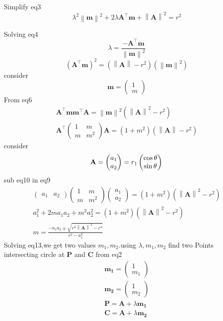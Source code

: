 \documentclass[journal,10pt,twocolumn]{article}
\providecommand{\norm}[1]{\left\lVert#1\right\rVert}
\let\vec\mathbf
\newcommand{\myvec}[1]{\ensuremath{\begin{pmatrix}#1\end{pmatrix}}}
\begin{document}
Simplify eq3
\begin{equation}
	\lambda^{2}\norm{\boldsymbol{m}}^{2}+2\lambda\vec{A}^\top\vec{m}+\norm{\boldsymbol{A}}^{2}=r^{2}
\end{equation}

Solving eq4
\begin{equation}
	\lambda=\frac{-\vec{A}^\top\vec{m}}{\norm{\boldsymbol{m}}^{2}}  
\end{equation}
\begin{equation}
	(\vec{A}^\top\vec{m})^{2}=(\norm{\boldsymbol{A}}-r^{2})(\norm{\boldsymbol{m}}^{2})
\end{equation}
consider
\begin{equation}
	\vec{m}=\myvec{1\\m}
\end{equation}
From eq6
\begin{eqnarray}
	\vec{A}^\top\vec{m}\vec{m}^\top\vec{A}=\norm{\boldsymbol{m}}^{2}(\norm{\boldsymbol{A}}^{2}-r^{2})\\
	\vec{A}^\top\myvec{1&m\\m&m^{2}}\vec{A}=(1+m^{2})(\norm{\boldsymbol{A}}-r^{2})
\end{eqnarray}
consider
\begin{equation}
	\vec{A}=\myvec{a_1\\a_2}=r_1\myvec{\cos{\theta}\\\sin{\theta}}\\
\end{equation}
sub eq10 in eq9
\begin{eqnarray}
	\myvec{a_1&a_2}\myvec{1&m\\m&m^{2}}\myvec{a_1\\a_2}=(1+m^{2})(\norm{\boldsymbol{A}}^{2}-r^{2})\\
	a_1^{2}+2ma_1a_2+m^{2}a_2^{2}=(1+m^{2})(\norm{\boldsymbol{A}}^{2}-r^{2})\\
	m =  \frac{-a_1a_2\pm\sqrt{r^2\norm{\vec{A}}^2-r^4}}{r^2-a_1^2}
\end{eqnarray}
Solving eq13,we get two values $m_1,m_2$.using $\lambda,m_1,m_2$ find two Points intersecting circle at $\vec{P}$ and $\vec{C}$ from eq2
\begin{eqnarray}
	\vec{m_1}=\myvec{1\\m_1}\\
	\vec{m_2}=\myvec{1\\m_2}\\
	\vec{P}=\vec{A}+\lambda\vec{m_1}\\
	\vec{C}=\vec{A}+\lambda\vec{m_2}
\end{eqnarray}
\end{document}
